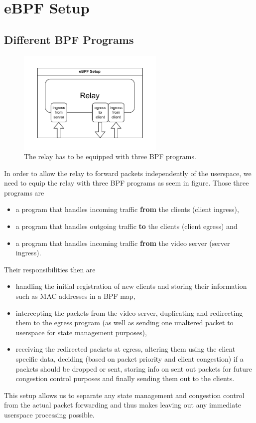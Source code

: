 \section{eBPF Setup}\label{sec:ebpf_setup}
\subsection{Different BPF Programs}
\begin{figure}[htbp]
    \centering
    \includegraphics[width=7cm]{figures/03_fast_relays/ebpf-setup.drawio.pdf}
    \caption{The relay has to be equipped with three BPF programs.}\label{fig:ebpf-programs}
\end{figure}

In order to allow the relay to forward packets independently of the userspace, we
need to equip the relay with three BPF programs as seem in figure.
Those three programs are 
\begin{itemize}
    \item a program that handles incoming traffic \textbf{from} the clients (client ingress),
    \item a program that handles outgoing traffic \textbf{to} the clients (client egress) and
    \item a program that handles incoming traffic \textbf{from} the video server (server ingress).
\end{itemize}
Their responsibilities then are
\begin{itemize}
    \item handling the initial registration of new clients and storing their information such as
    MAC addresses in a BPF map,
    \item intercepting the packets from the video server, duplicating and redirecting them to 
    the egress program (as well as sending one unaltered packet to userspace for state
    management purposes),
    \item receiving the redirected packets at egress, altering them using the client specific
    data, deciding (based on packet priority and client congestion) if a packets should be dropped 
    or sent, storing info on sent out packets for future congestion control purposes and finally sending 
    them out to the clients.
\end{itemize}
This setup allows us to separate any state management and congestion control from the actual
packet forwarding and thus makes leaving out any immediate userspace processing possible.

